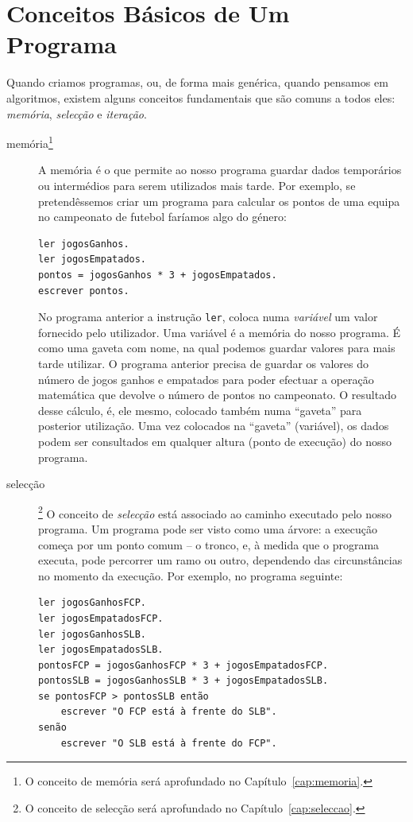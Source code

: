 \section{Conceitos Básicos de Um Programa}
Quando criamos programas, ou, de forma mais genérica, quando pensamos em algoritmos, existem alguns conceitos fundamentais que são comuns a todos eles: \emph{memória}, \emph{selecção} e \emph{iteração}.

\begin{description}
\item[memória\footnote{O conceito de memória será aprofundado no Capítulo~\ref{cap:memoria}.}]
A memória é o que permite ao nosso programa guardar dados temporários ou intermédios para serem utilizados mais tarde.
Por exemplo, se pretendêssemos criar um programa para calcular os pontos de uma equipa no campeonato de futebol faríamos algo do género:
\begin{lstlisting}
ler jogosGanhos.
ler jogosEmpatados.
pontos = jogosGanhos * 3 + jogosEmpatados.
escrever pontos.
\end{lstlisting}
No programa anterior a instrução \texttt{ler}, coloca numa \emph{variável} um valor fornecido pelo utilizador. Uma variável
é a memória do nosso programa. É como uma gaveta com nome, na qual podemos guardar valores para mais tarde utilizar.
O programa anterior precisa de guardar os valores do número de jogos ganhos e empatados para poder efectuar a operação matemática que devolve o número de pontos no campeonato. O resultado desse cálculo, é, ele mesmo, colocado também numa ``gaveta'' para posterior utilização. Uma vez colocados na ``gaveta'' (variável), os dados podem ser consultados em qualquer altura (ponto de execução) do nosso programa. 

\item[selecção] \footnote{O conceito de selecção será aprofundado no Capítulo~\ref{cap:seleccao}.}
O conceito de \emph{selecção} está associado ao caminho executado pelo nosso programa. Um programa pode ser visto como uma árvore: a execução começa por um ponto comum -- o tronco, e, à medida que o programa executa, pode percorrer um ramo ou outro, dependendo das circunstâncias no momento da execução.
Por exemplo, no programa seguinte:
\begin{lstlisting}
ler jogosGanhosFCP.
ler jogosEmpatadosFCP.
ler jogosGanhosSLB.
ler jogosEmpatadosSLB.
pontosFCP = jogosGanhosFCP * 3 + jogosEmpatadosFCP.
pontosSLB = jogosGanhosSLB * 3 + jogosEmpatadosSLB.
se pontosFCP > pontosSLB então
	escrever "O FCP está à frente do SLB".
senão
	escrever "O SLB está à frente do FCP".     
\end{lstlisting}


\end{description}
